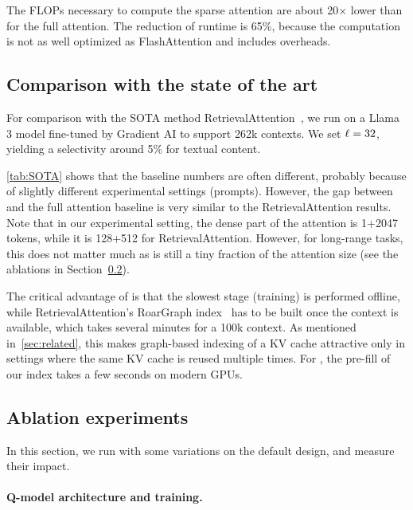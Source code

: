 The FLOPs necessary to compute the sparse attention are about 20$\times$ lower than for the full attention. 
The reduction of runtime is 65\%, because the computation is not as well optimized as FlashAttention and includes overheads. 






\subsection{Comparison with the state of the art}

For comparison with the SOTA method RetrievalAttention~\cite{liu2024retrievalattention}, we run \OURS on a Llama 3 model fine-tuned by Gradient AI to support 262k contexts. 
We set $\ell=32$, yielding a selectivity around 5\% for textual content. 

\autoref{tab:SOTA} shows that the baseline numbers are often different, probably because of slightly different experimental settings (prompts). 
However, the gap between \OURS and the full attention baseline is very similar to the RetrievalAttention results. 
%
Note that in our experimental setting, the dense part of the attention is 1+2047 tokens, while it is 128+512 for RetrievalAttention. 
However, for long-range tasks, this does not matter much as is still a tiny fraction of the attention size (see the ablations in Section~\ref{sec:ablations}). 

%

The critical advantage of \OURS is that the slowest stage (training) is performed offline, while RetrievalAttention's RoarGraph index~\cite{chen2024roargraph} has to be built once the context is available, which takes several minutes for a 100k context. 
As mentioned in~\autoref{sec:related}, this makes graph-based indexing of a KV cache attractive only in settings where the same KV cache is reused multiple times.
For \OURS, the pre-fill of our index takes a few seconds on modern GPUs. 

%
%
%
%
%
%




\subsection{Ablation experiments}
\label{sec:ablations}

In this section, we run \OURS with some variations on the default design, and measure their impact. 

\paragraph{Q-model architecture and training.}

